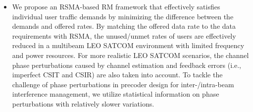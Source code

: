 \documentclass[draftclsnofoot, onecolumn, comsoc, 12pt]{IEEEtran}
\begin{document}
\begin{itemize}
\item We propose an RSMA-based RM framework that effectively satisfies individual user traffic demands by minimizing the difference between the demands and offered rates. {By matching the offered data rate to the data requirements with RSMA, the unused/unmet rates of users are effectively reduced in a multibeam LEO SATCOM environment with limited frequency and power resources. For more realistic LEO SATCOM scenarios, the channel phase perturbations caused by channel estimation and feedback errors (i.e., imperfect CSIT and CSIR) are also taken into account. To tackle the challenge of phase perturbations in precoder design for inter-/intra-beam interference management, we utilize statistical information on phase perturbations with relatively slower variations.}



\end{itemize}
\end{document}
